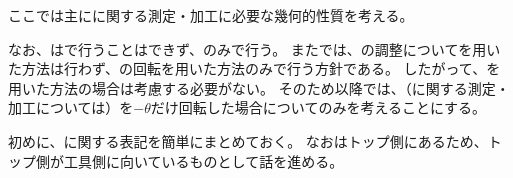 

ここでは主に\textbf{\Dimple}に関する測定・加工に必要な幾何的性質を考える。

なお、\DimpleMilling は\MMC で行うことはできず、\DMC のみで行う。
また\DMC では、\AlocationLength の調整について\Spacer を用いた方法は行わず、\Table の回転を用いた方法のみで行う方針である。
したがって、\Spacer を用いた方法の場合は考慮する必要がない。
そのため以降では、（\Dimple に関する測定・加工については）\Table を$-\theta$だけ回転した場合についてのみを考えることにする。



初めに、\nameDimple に関する表記を簡単にまとめておく。
なお\Dimple はトップ側にあるため、トップ側が工具側に向いているものとして話を進める。

